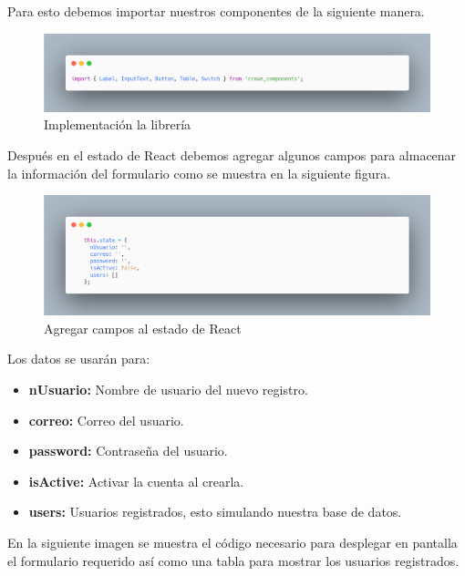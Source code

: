 Para esto debemos importar nuestros componentes de la siguiente manera.
\newline
\begin{figure}[H]
    \includegraphics[width=1\textwidth]{./Imagenes/9.6}
   \centering 
    \caption[Implementación la librería]{Implementación la librería}
    \end{figure}
\newline

Después en el estado de React debemos agregar algunos campos para almacenar la información del formulario como se muestra en la siguiente figura.
\newline
\begin{figure}[H]
    \includegraphics[width=1\textwidth]{./Imagenes/9.7}
   \centering 
    \caption[Agregar campos al estado de React]{Agregar campos al estado de React}
    \end{figure}
\newline
Los datos se usarán para:

  \begin{itemize}
   \item \textbf{ nUsuario:} Nombre de usuario del nuevo registro.
   \item \textbf{ correo:} Correo del usuario.
   \item \textbf{ password:} Contraseña del usuario.
   \item \textbf{ isActive:} Activar la cuenta al crearla.
   \item \textbf{ users:} Usuarios registrados, esto simulando nuestra base de datos.
  \end{itemize}

En la siguiente imagen se muestra el código necesario para desplegar en pantalla el formulario requerido así como una tabla para mostrar los usuarios registrados.

